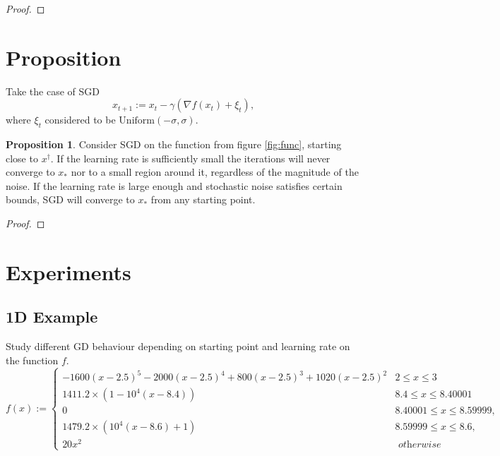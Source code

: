 \documentclass{article}
\theoremstyle{definition}
\newtheorem{proposition}[theorem]{Proposition}
\begin{document}
\begin{proof}
    
\end{proof}

\section*{Proposition}
Take the case of SGD 
$$ 
x_{t + 1} := x_t - \gamma \left( 
    \nabla f(x_t) + \xi_t
\right),
$$
where $\xi_t$ considered to be $\mathrm{Uniform}(-\sigma, \sigma)$.

\begin{proposition}
    Consider SGD on the function from figure \ref{fig:func}, 
    starting close to $x^\dagger$.
    If the learning rate is sufficiently small the iterations
    will never converge to $x_\ast$ nor to a small region around it, 
    regardless of the magnitude of the noise. 
    If the learning rate is large enough and stochastic noise
    satisfies certain bounds, SGD will converge to $x_\ast$ 
    from any starting point.
\end{proposition}

\begin{proof}
    
\end{proof}

\clearpage 

\section{Experiments}
\subsection*{1D Example}
Study different GD behaviour depending on starting point and learning rate 
on the function $f$. 
$$
f(x):= \begin{cases}
    -1600(x-2.5)^5-2000(x-2.5)^4+800(x-2.5)^3+1020(x-2.5)^2 & 2 \leq x \leq 3 \\ 
    1411.2 \times\left(1-10^4(x-8.4)\right) & 8.4 \leq x \leq 8.40001 \\ 
    0 & 8.40001 \leq x \leq 8.59999, \\ 
    1479.2 \times\left(10^4(x-8.6)+1\right) & 8.59999 \leq x \leq 8.6, \\ 
    20 x^2 & \textit{ otherwise }
\end{cases}
$$
\end{document}
